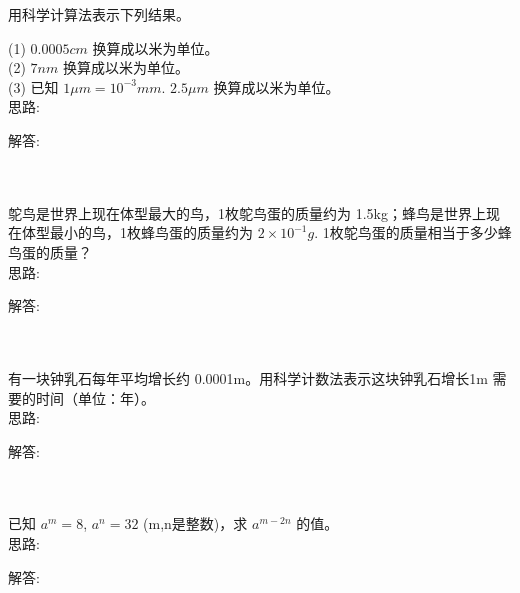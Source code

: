 \item {
    用科学计算法表示下列结果。
    
    (1) $ 0.0005 cm$ 换算成以米为单位。\\
    (2) $ 7 nm $ 换算成以米为单位。\\
    (3) 已知 $1 \mu m = 10^{-3}mm$. $ 2.5 \mu m$ 换算成以米为单位。
    \ifshowSolution
        \fangsong{}
        \\
        思路:

        解答: 
    \else
        \\ \\ \\
    \fi
}

\item {
    鸵鸟是世界上现在体型最大的鸟，1枚鸵鸟蛋的质量约为 1.5kg；蜂鸟是世界上现在体型最小的鸟，1枚蜂鸟蛋的质量约为 $2\times 10^{-1}g$. 1枚鸵鸟蛋的质量相当于多少蜂鸟蛋的质量？
    \ifshowSolution
        \fangsong{}
        \\
        思路:

        解答: 
    \else
        \\ \\ \\
    \fi
}

\item {
    有一块钟乳石每年平均增长约 0.0001m。用科学计数法表示这块钟乳石增长1m 需要的时间（单位：年）。
    \ifshowSolution
        \fangsong{}
        \\
        思路:

        解答: 
    \else
        \\ \\ \\
    \fi
}

\item {
    已知 $a^m = 8$, $a^n = 32$ (m,n是整数)，求 $a^{m-2n}$ 的值。
    \ifshowSolution
        \fangsong{}
        \\
        思路:

        解答: 
    \else
        \\ \\ \\
    \fi
}